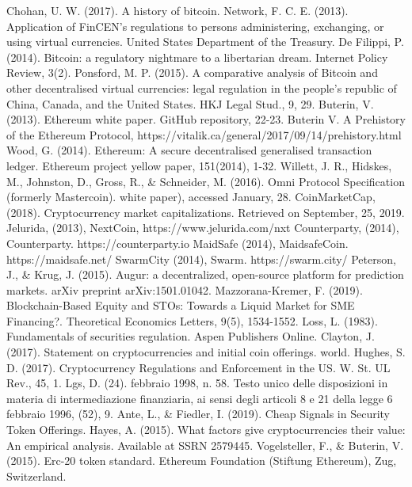 \begin{thebibliography}{90}
 Chohan, U. W. (2017). A history of bitcoin.
 Network, F. C. E. (2013). Application of FinCEN’s regulations to persons administering, exchanging, or using virtual currencies. United States Department of the Treasury.
 De Filippi, P. (2014). Bitcoin: a regulatory nightmare to a libertarian dream. Internet Policy Review, 3(2).
 Ponsford, M. P. (2015). A comparative analysis of Bitcoin and other decentralised virtual currencies: legal regulation in the people's republic of China, Canada, and the United States. HKJ Legal Stud., 9, 29.
 Buterin, V. (2013). Ethereum white paper. GitHub repository, 22-23.
 Buterin V. A Prehistory of the Ethereum Protocol, https://vitalik.ca/general/2017/09/14/prehistory.html
 Wood, G. (2014). Ethereum: A secure decentralised generalised transaction ledger. Ethereum project yellow paper, 151(2014), 1-32.
 Willett, J. R., Hidskes, M., Johnston, D., Gross, R., \& Schneider, M. (2016). Omni Protocol Specification (formerly Mastercoin). white paper), accessed January, 28.
 CoinMarketCap, (2018). Cryptocurrency market capitalizations. Retrieved on September, 25, 2019.
 Jelurida, (2013), NextCoin, https://www.jelurida.com/nxt
 Counterparty, (2014), Counterparty. https://counterparty.io
  MaidSafe (2014), MaidsafeCoin. https://maidsafe.net/
 SwarmCity (2014), Swarm. https://swarm.city/
 Peterson, J., \& Krug, J. (2015). Augur: a decentralized, open-source platform for prediction markets. arXiv preprint arXiv:1501.01042.
 Mazzorana-Kremer, F. (2019). Blockchain-Based Equity and STOs: Towards a Liquid Market for SME Financing?. Theoretical Economics Letters, 9(5), 1534-1552.
  Loss, L. (1983). Fundamentals of securities regulation. Aspen Publishers Online.
 Clayton, J. (2017). Statement on cryptocurrencies and initial coin offerings. world.
 Hughes, S. D. (2017). Cryptocurrency Regulations and Enforcement in the US. W. St. UL Rev., 45, 1.
 Lgs, D. (24). febbraio 1998, n. 58. Testo unico delle disposizioni in materia di intermediazione finanziaria, ai sensi degli articoli 8 e 21 della legge 6 febbraio 1996, (52), 9.
 Ante, L., \& Fiedler, I. (2019). Cheap Signals in Security Token Offerings.
 Hayes, A. (2015). What factors give cryptocurrencies their value: An empirical analysis. Available at SSRN 2579445.
 Vogelsteller, F., \& Buterin, V. (2015). Erc-20 token standard. Ethereum Foundation (Stiftung Ethereum), Zug, Switzerland.
\end{thebibliography}